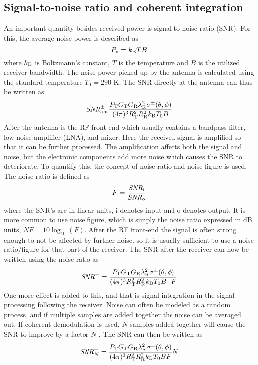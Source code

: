 \documentclass[11pt,twoside]{eitExjobb}
\begin{document}
	\subsection{Signal-to-noise ratio and coherent integration \label{sec:app-derivations-radar-SNR}}
	An important quantity besides received power is signal-to-noise ratio (SNR). For this, the average noise power is described as \cite{Young2004}
	\begin{equation*}
		P_{\mathrm{n}} = k_{\mathrm{B}} TB
	\end{equation*}
	where $k_{\mathrm{B}}$ is Boltzmann's constant, $T$ is the temperature and $B$ is the utilized receiver bandwidth. The noise power picked up by the antenna is calculated using the standard temperature $T_0 = 290$ K. The SNR directly at the antenna can thus be written as
	\begin{equation*}
		\mathit{SNR}^\pm_{\mathrm{ant}} \frac{P_{\mathrm{T}} G_{\mathrm{T}} G_{\mathrm{R}} \lambda_{\mathrm{R}}^2 \sigma^\pm (\theta,\phi)}{(4\pi)^3 R_{\mathrm{T}}^2 R_{\mathrm{R}}^2 k_{\mathrm{B}} T_0 B}
	\end{equation*}
	After the antenna is the RF front-end which usually contains a bandpass filter, low-noise amplifier (LNA), and mixer. Here the received signal is amplified so that it can be further processed. The amplification affects both the signal and noise, but the electronic components add more noise which causes the SNR to deteriorate. To quantify this, the concept of noise ratio and noise figure is used. The noise ratio is defined as \cite{Young2004}
	\begin{equation*}
		F = \frac{\mathit{SNR}_{\mathrm{i}}}{\mathit{SNR}_{\mathrm{o}}}
	\end{equation*}
	where the SNR's are in linear units, i denotes input and o denotes output. It is more common to use noise figure, which is simply the noise ratio expressed in dB units, $\mathit{NF} = 10\log_{10}(F)$. After the RF front-end the signal is often strong enough to not be affected by further noise, so it is usually sufficient to use a noise ratio/figure for that part of the receiver. The SNR after the receiver can now be written using the noise ratio as
	\begin{equation*}
		\mathit{SNR}^\pm = \frac{P_{\mathrm{T}} G_{\mathrm{T}} G_{\mathrm{R}} \lambda_{\mathrm{R}}^2 \sigma^\pm (\theta,\phi)}{(4\pi)^3 R_{\mathrm{T}}^2 R_{\mathrm{R}}^2 k_{\mathrm{B}} T_0 B \cdot F}
	\end{equation*}
	One more effect is added to this, and that is signal integration in the signal processing following the receiver. Noise can often be modeled as a random process, and if multiple samples are added together the noise can be averaged out. If coherent demodulation is used, $N$ samples added together will cause the SNR to improve by a factor $N$ \cite{Richards2012}. The SNR can then be written as
	\begin{equation*}
		\mathit{SNR}^\pm_N = \frac{P_{\mathrm{T}} G_{\mathrm{T}} G_{\mathrm{R}} \lambda_{\mathrm{R}}^2 \sigma^\pm (\theta,\phi)}{(4\pi)^3 R_{\mathrm{T}}^2 R_{\mathrm{R}}^2 k_{\mathrm{B}} T_0 B F} N
	\end{equation*}
	
\end{document}
